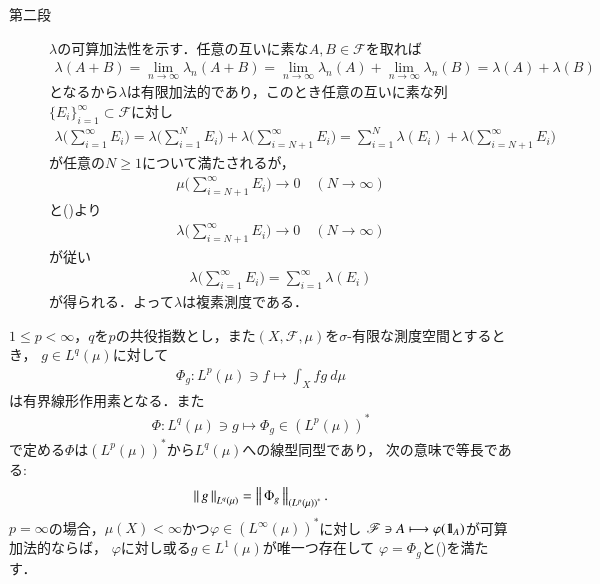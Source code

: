 \begin{prf}
\begin{description}
			\item[第二段] $\lambda$の可算加法性を示す．任意の互いに素な$A,B \in \mathscr{F}$を取れば
				\begin{align}
					\lambda(A + B) = \lim_{n \to \infty} \lambda_n(A + B)
					= \lim_{n \to \infty} \lambda_n(A) + \lim_{n \to \infty} \lambda_n(B)
					= \lambda(A) + \lambda(B)
				\end{align}
				となるから$\lambda$は有限加法的であり，このとき任意の互いに素な列$\{E_i\}_{i=1}^\infty \subset \mathscr{F}$に対し
				\begin{align}
					\lambda\Biggl( \sum_{i=1}^\infty E_i \Biggr)
					= \lambda\Biggl( \sum_{i=1}^N E_i \Biggr) + \lambda\Biggl( \sum_{i=N+1}^\infty E_i \Biggr)
					= \sum_{i=1}^N \lambda(E_i) + \lambda\Biggl( \sum_{i=N+1}^\infty E_i \Biggr)
				\end{align}
				が任意の$N \geq 1$について満たされるが，
				\begin{align}
					\mu\Biggl( \sum_{i=N+1}^\infty E_i \Biggr) \longrightarrow 0 \quad (N \longrightarrow \infty)
				\end{align}
				と()より
				\begin{align}
					\lambda\Biggl( \sum_{i=N+1}^\infty E_i \Biggr) \longrightarrow 0 \quad (N \longrightarrow \infty)
				\end{align}
				が従い
				\begin{align}
					\lambda\Biggl( \sum_{i=1}^\infty E_i \Biggr) = \sum_{i=1}^\infty \lambda(E_i)
				\end{align}
				が得られる．よって$\lambda$は複素測度である．
				\QED
		\end{description}
	\end{prf}
	
	\begin{screen}
		\begin{thm}[$L^p$の共役空間]\label{thm:dual_space_of_L_p}
			$1 \leq p < \infty$，$q$を$p$の共役指数とし，また$(X,\mathscr{F},\mu)$を$\sigma$-有限な測度空間とするとき，
			$g \in L^q(\mu)$に対して
			\begin{align}
				\Phi_g: L^p(\mu) \ni f \longmapsto \int_X fg\ d\mu
				\label{eq:thm_dual_space_of_L_p_1}
			\end{align}
			は有界線形作用素となる．また
			\begin{align}
				\Phi: L^q(\mu) \ni g \longmapsto \Phi_g \in \left( L^p(\mu) \right)^*
			\end{align}
			で定める$\Phi$は$\left( L^p(\mu) \right)^*$から$L^q(\mu)$への線型同型であり，
			次の意味で等長である:
			\begin{align}
				\left\|\, g\, \right\|_{L^q(\mu)} = \left\|\, \Phi_g\, \right\|_{\left( L^p(\mu) \right)^*}.
				\label{eq:thm_dual_space_of_L_p_asseretion_2}
			\end{align}
			$p=\infty$の場合，$\mu(X) < \infty$かつ$\varphi \in \left( L^\infty(\mu) \right)^*$に対し
			$\mathscr{F} \ni A \longmapsto \varphi(\mbox{1}\hspace{-0.25em}\mbox{l}_A)$が可算加法的ならば，
			$\varphi$に対し或る$g \in L^1(\mu)$が唯一つ存在して
			$\varphi = \Phi_g$と()を満たす．
		\end{thm}
	\end{screen}
	
